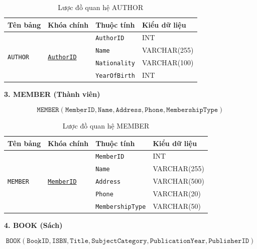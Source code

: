 \documentclass[12pt,a4paper]{article}
\begin{document}
\begin{table}[H]
\centering
\caption{Lược đồ quan hệ AUTHOR}
\begin{tabular}{@{}|l|l|l|l|@{}}
\hline
\textbf{Tên bảng} & \textbf{Khóa chính} & \textbf{Thuộc tính} & \textbf{Kiểu dữ liệu} \\ \hline
\multirow{4}{*}{\texttt{AUTHOR}} & \multirow{4}{*}{\underline{\texttt{AuthorID}}} & \texttt{AuthorID} & INT \\ \cline{3-4}
& & \texttt{Name} & VARCHAR(255) \\ \cline{3-4}
& & \texttt{Nationality} & VARCHAR(100) \\ \cline{3-4}
& & \texttt{YearOfBirth} & INT \\ \hline
\end{tabular}
\end{table}

\textbf{3. MEMBER (Thành viên)}

$$
\texttt{MEMBER}(\underline{\texttt{MemberID}}, \texttt{Name}, \texttt{Address}, \texttt{Phone}, \texttt{MembershipType})
$$

\begin{table}[H]
\centering
\caption{Lược đồ quan hệ MEMBER}
\begin{tabular}{@{}|l|l|l|l|@{}}
\hline
\textbf{Tên bảng} & \textbf{Khóa chính} & \textbf{Thuộc tính} & \textbf{Kiểu dữ liệu} \\ \hline
\multirow{5}{*}{\texttt{MEMBER}} & \multirow{5}{*}{\underline{\texttt{MemberID}}} & \texttt{MemberID} & INT \\ \cline{3-4}
& & \texttt{Name} & VARCHAR(255) \\ \cline{3-4}
& & \texttt{Address} & VARCHAR(500) \\ \cline{3-4}
& & \texttt{Phone} & VARCHAR(20) \\ \cline{3-4}
& & \texttt{MembershipType} & VARCHAR(50) \\ \hline
\end{tabular}
\end{table}

\textbf{4. BOOK (Sách)}

$$
\texttt{BOOK}(\underline{\texttt{BookID}}, \texttt{ISBN}, \texttt{Title}, \texttt{SubjectCategory}, \texttt{PublicationYear}, \texttt{PublisherID})
$$
\end{document}
